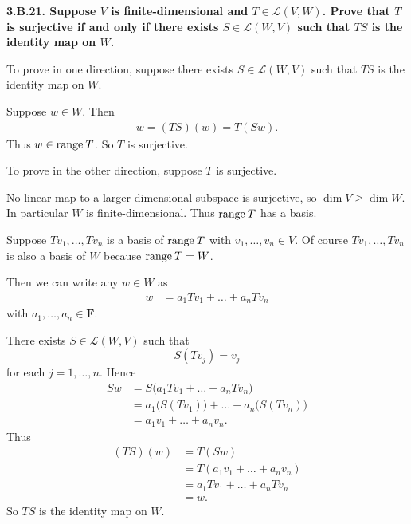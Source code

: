 \documentclass[a5paper]{article}
\begin{document}
\newcommand   \C           {\mathbf{C}}
\newcommand   \R           {\mathbf{R}}
\renewcommand \L           {\mathcal{L}}
\newcommand   \F           {\mathbf{F}}
\renewcommand \P           {\mathcal{P}}
\newcommand   \nullspace   {\text{null\:}}
\newcommand   \range       {\text{range\:}}
\newcommand   \linspan     {\text{span\:}}
\newcommand   \question[1] {\textbf{\boldmath#1\unboldmath}\par}

\question{
    3.B.21.
    Suppose $V$ is finite-dimensional and $T \in \L(V,W)$.
    Prove that $T$ is surjective if and only if there exists $S \in \L(W,V)$ such that $TS$ is the identity map on $W$.
}
    To prove in one direction, suppose there exists $S \in \L(W,V)$ such that $TS$ is the identity map on $W$.

    Suppose $w \in W$.
    Then
\begin{align*}
        w = (TS)(w) = T(Sw) .
\end{align*}
    Thus $w \in \range T$.
    So $T$ is surjective.

    To prove in the other direction, suppose $T$ is surjective.

    No linear map to a larger dimensional subspace is surjective, so $\dim V \ge \dim W$.
    In particular $W$ is finite-dimensional.
    Thus $\range T$ has a basis.

    Suppose $Tv_1,\dots,Tv_n$ is a basis of $\range T$ with $v_1,\dots,v_n \in V$.
    Of course $Tv_1,\dots,Tv_n$ is also a basis of $W$ because $\range T = W$.

    Then we can write any $w \in W$ as
\begin{align*}
        w &= a_1Tv_1 + \dots + a_nTv_n
\end{align*}
    with $a_1,\dots,a_n \in \F$.

    There exists $S \in \L(W,V)$ such that
\begin{equation*}
        S(Tv_j) = v_j
\end{equation*}
    for each $j = 1,\dots,n$.
    Hence
\begin{align*}
        Sw &= S \big( a_1Tv_1 + \dots + a_nTv_n \big) \\
           &= a_1 \big( S(Tv_1) \big) + \dots + a_n \big( S(Tv_n) \big) \\
           &= a_1v_1 + \dots + a_nv_n .
\end{align*}
    Thus
\begin{align*}
        (TS)(w) &= T (Sw) \\
                &= T (a_1v_1 + \dots + a_nv_n) \\
                &= a_1Tv_1 + \dots + a_nTv_n \\
                &= w .
\end{align*}
    So $TS$ is the identity map on $W$.
\end{document}
